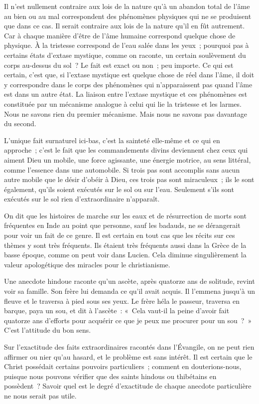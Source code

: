 \documentclass[french,twoside]{book} %
\begin{document}
Il n'est nullement contraire aux lois de la nature qu'à un abandon total de l'âme au bien ou au mal correspondent des phénomènes physiques qui ne se produisent que dans ce cas. Il serait contraire aux lois de la nature qu'il en fût autrement. Car à chaque manière d'être de l'âme humaine correspond quelque chose de physique. À la tristesse correspond de l'eau salée dans les yeux ; pourquoi pas à certains états d'extase mystique, comme on raconte, un certain soulèvement du corps au-dessus du sol ? Le fait est exact ou non ; peu importe. Ce qui est certain, c'est que, si l'extase mystique est quelque chose de réel dans l'âme, il doit y correspondre dans le corps des phénomènes qui n'apparaissent pas quand l'âme est dans un autre état. La liaison entre l'extase mystique et ces phénomènes est constituée par un mécanisme analogue à celui qui lie la tristesse et les larmes. Nous ne savons rien du premier mécanisme. Mais nous ne savons pas davantage du second.\par
L'unique fait surnaturel ici-bas, c'est la sainteté elle-même et ce qui en approche ; c'est le fait que les commandements divins deviennent chez ceux qui aiment Dieu un mobile, une force agissante, une énergie motrice, au sens littéral, comme l'essence dans une automobile. Si trois pas sont accomplis sans aucun autre mobile que le désir d'obéir à Dieu, ces trois pas sont miraculeux ; ils le sont également, qu'ils soient exécutés sur le sol ou sur l'eau. Seulement s'ils sont exécutés sur le sol rien d'extraordinaire n'apparaît.\par
On dit que les histoires de marche sur les eaux et de résurrection de morts sont fréquentes en Inde au point que personne, sauf les badauds, ne se dérangerait pour voir un fait de ce genre. Il est certain en tout cas que les récits sur ces thèmes y sont très fréquents. Ils étaient très fréquents aussi dans la Grèce de la basse époque, comme on peut voir dans Lucien. Cela diminue singulièrement la valeur apologétique des miracles pour le christianisme.\par
Une anecdote hindoue raconte qu'un ascète, après quatorze ans de solitude, revint voir sa famille. Son frère lui demanda ce qu'il avait acquis. Il l'emmena jusqu'à un fleuve et le traversa à pied sous ses yeux. Le frère héla le passeur, traversa en barque, paya un sou, et dit à l'ascète : « Cela vaut-il la peine d'avoir fait quatorze ans d'efforts pour acquérir ce que je peux me procurer pour un sou ? » C'est l'attitude du bon sens.\par
Sur l'exactitude des faits extraordinaires racontés dans l'Évangile, on ne peut rien affirmer ou nier qu'au hasard, et le problème est sans intérêt. Il est certain que le Christ possédait certains pouvoirs particuliers ; comment en douterions-nous, puisque nous pouvons vérifier que des saints hindous ou thibétains en possèdent ? Savoir quel est le degré d'exactitude de chaque anecdote particulière ne nous serait pas utile.\par
\end{document}
